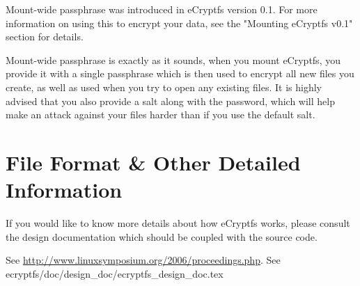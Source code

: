 \documentclass{article}
\begin{document}
Mount-wide passphrase was introduced in eCryptfs version 0.1. For more
information on using this to encrypt your data, see the
"Mounting eCryptfs v0.1" section for details.

Mount-wide passphrase is exactly as it sounds, when you mount eCryptfs, you
provide it with a single passphrase which is then used to encrypt all new
files you create, as well as used when you try to open any existing files.
It is highly advised that you also provide a salt along with the password,
which will help make an attack against your files harder than if you use
the default salt.

\section*{File Format \& Other Detailed Information}

If you would like to know more details about how eCryptfs works, please
consult the design documentation which should be coupled with the
source code.

\begin{thebibliography}{1}

 See
  \url{http://www.linuxsymposium.org/2006/proceedings.php}.
 See
  ecryptfs/doc/design\_doc/ecryptfs\_design\_doc.tex

\end{thebibliography}
\end{document}
